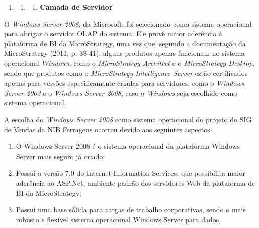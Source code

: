 \documentclass[a4paper]{article}
\newcommand\liststyleWWviiiNumi{%
\renewcommand\theenumi{\arabic{enumi}}
\renewcommand\theenumii{\arabic{enumi}.\arabic{enumii}}
\renewcommand\theenumiii{\arabic{enumi}.\arabic{enumii}.\arabic{enumiii}}
\renewcommand\theenumiv{\arabic{enumi}.\arabic{enumii}.\arabic{enumiii}.\arabic{enumiv}}
\renewcommand\labelenumi{\theenumi}
\renewcommand\labelenumii{\theenumii}
\renewcommand\labelenumiii{\theenumiii}
\renewcommand\labelenumiv{\theenumiv.}
}
\newcommand\liststyleWWviiiNumxiii{%
\renewcommand\theenumi{\alph{enumi}}
\renewcommand\theenumii{\alph{enumii}}
\renewcommand\theenumiii{\roman{enumiii}}
\renewcommand\theenumiv{\arabic{enumiv}}
\renewcommand\labelenumi{\theenumi)}
\renewcommand\labelenumii{\theenumii.}
\renewcommand\labelenumiii{\theenumiii.}
\renewcommand\labelenumiv{\theenumiv.}
}
\begin{document}
\bigskip

\liststyleWWviiiNumi
\begin{enumerate}
\item \begin{enumerate}
\item \begin{enumerate}
\item {
\textsf{\textbf{Camada de Servidor}}}
\end{enumerate}
\end{enumerate}
\end{enumerate}
{
\textsf{O }\textsf{\textit{Windows Server 2008}}\textsf{, da Microsoft, foi selecionado como sistema operacional para
abrigar o servidor OLAP do sistema. Ele prov\^e maior ader\^encia \`a plataforma de BI da MicroStrategy, uma vez que,
segundo a documenta\c{c}\~ao da MicroStrategy (2011, p. 38-41), alguns produtos apenas funcionam no sistema operacional
}\textsf{\textit{Windows}}\textsf{, como o }\textsf{\textit{MicroStrategy Architect}}\textsf{ e o
}\textsf{\textit{MicroStrategy Desktop}}\textsf{, sendo que produtos como o }\textsf{\textit{MicroStrategy Intelligence
Server}}\textsf{ est\~ao certificados apenas para vers\~oes especificamente criadas para servidores, como o
}\textsf{\textit{Windows Server 2003}}\textsf{ e o }\textsf{\textit{Windows Server 2008}}\textsf{, caso o
}\textsf{\textit{Windows}}\textsf{ seja escolhido como sistema operacional.}}

{
\textsf{A escolha do }\textsf{\textit{Windows Server 2008}}\textsf{ como sistema operacional do projeto do SIG de Vendas
da NIB Ferragens ocorreu devido aos seguintes aspectos:}}

\liststyleWWviiiNumxiii
\begin{enumerate}
\item {
\textsf{O Windows Server 2008 \'e o sistema operacional da plataforma Windows Server mais seguro j\'a criado;}}
\item {
\textsf{Possui a vers\~ao 7.0 do Internet Information Services, que possibilita maior ader\^encia ao ASP.Net, ambiente
padr\~ao dos servidores Web da plataforma de BI da MicroStrategy;}}
\item {
\textsf{Possui uma base s\'olida para cargas de trabalho corporativas, sendo o mais robusto e flex\'ivel sistema
operacional Windows Server para dados. }}
\end{enumerate}
\end{document}
